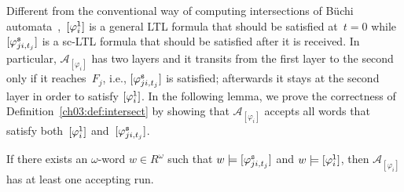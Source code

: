 Different from the conventional way of computing intersections of B\"uchi automata~\cite{baier2008principles},~$[\varphi_i^{\textup{\texttt{l}}}]$ is a general LTL formula that should be satisfied at~$t=0$ while $[\varphi_{ji,t_j}^{\textup{\texttt{s}}}]$ is a sc-LTL formula that should be satisfied after it is received.
In particular, ${\mathcal{A}}_{[\varphi_i]}$  has two layers and it transits from the first layer to the second only if it reaches~$F_j$, i.e., ${[\varphi_{ji,t_j}^{\textup{\texttt{s}}}]}$ is satisfied; afterwards it stays at the second layer in order to satisfy ${[\varphi_i^{\textup{\texttt{l}}}]}$.
In the following lemma, we prove the correctness of Definition~\ref{ch03:def:intersect} by showing that ${\mathcal{A}}_{[\varphi_i]}$ accepts all words that satisfy both~$[\varphi_i^{\textup{\texttt{l}}}]$ and~$[\varphi_{ji,t_j}^{\textup{\texttt{s}}}]$.
\begin{lemma} \label{ch03:lem:intersection1}
  If there exists an $\omega$-word $w\in R^\omega$ such that $w\models [\varphi_{ji,t_j}^{\textup{\texttt{s}}}]$ and $w\models [\varphi_i^{\textup{\texttt{l}}}]$, then $\mathcal{A}_{[\varphi_i]}$ has at least one accepting run.
\end{lemma}
